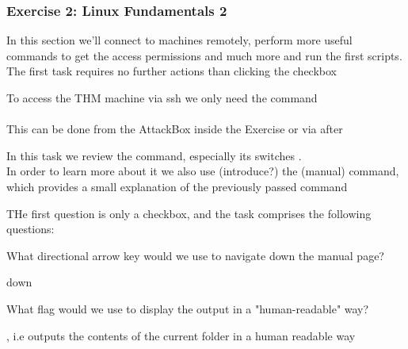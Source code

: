 \subsubsection*{Exercise 2: Linux Fundamentals 2}
\label{Exercise 2: Linux Fundamentals 2}

In this section we'll connect to machines remotely, perform more useful commands to get the access permissions and much more and run the first scripts.\\
The first task requires no further actions than clicking the checkbox
\begin{task}
To access the THM machine via ssh we only need the command\\
\\
This can be done from the AttackBox inside the Exercise or via  after 
\end{task}
\begin{task}
In this task we review the  command, especially its switches .\\
In order to learn more about it we also use (introduce?) the  (manual) command, which provides a small explanation of the previously passed command

THe first question is only a checkbox, and the task comprises the following questions: 
\begin{Q}
What directional arrow key would we use to navigate down the manual page?
\end{Q}
\begin{A}
down
\end{A}

\begin{Q}
What flag would we use to display the output in a "human-readable" way?
\end{Q}
\begin{A}
, i.e  outputs the contents of the current folder in a human readable way
\end{A}

\end{task}

